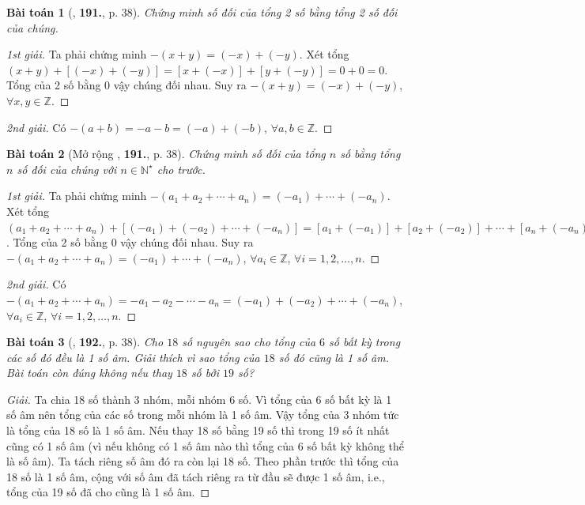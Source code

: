 \documentclass{article}
\numberwithin{equation}{section}
\newtheorem{baitoan}{Bài toán}
\begin{document}
\begin{baitoan}[\cite{Tuyen_Toan_6}, \textbf{191.}, p. 38]
	Chứng minh số đối của tổng 2 số bằng tổng 2 số đối của chúng.
\end{baitoan}

\begin{proof}[1st giải]
	Ta phải chứng minh $-(x + y) = (-x) + (-y)$. Xét tổng $(x + y) + [(-x) + (-y)] = [x + (-x)] + [y + (-y)] = 0 + 0 = 0$. Tổng của 2 số bằng 0 vậy chúng đối nhau. Suy ra $-(x + y) = (-x) + (-y)$, $\forall x,y\in\mathbb{Z}$.
\end{proof}

\begin{proof}[2nd giải]
	Có $-(a + b) = -a - b = (-a) + (-b)$, $\forall a,b\in\mathbb{Z}$.
\end{proof}

\begin{baitoan}[Mở rộng \cite{Tuyen_Toan_6}, \textbf{191.}, p. 38]
	Chứng minh số đối của tổng $n$ số bằng tổng $n$ số đối của chúng với $n\in\mathbb{N}^\star$ cho trước.
\end{baitoan}

\begin{proof}[1st giải]
	Ta phải chứng minh $-(a_1 + a_2 + \cdots + a_n) = (-a_1) + \cdots + (-a_n)$. Xét tổng $(a_1 + a_2 + \cdots + a_n) + [(-a_1) + (-a_2) + \cdots + (-a_n)] = [a_1 + (-a_1)] + [a_2 + (-a_2)] + \cdots + [a_n + (-a_n)] = 0 + 0 + \cdots + 0 = 0$. Tổng của 2 số bằng 0 vậy chúng đối nhau. Suy ra $-(a_1 + a_2 + \cdots + a_n) = (-a_1) + \cdots + (-a_n)$, $\forall a_i\in\mathbb{Z}$, $\forall i = 1,2,\ldots,n$.
\end{proof}

\begin{proof}[2nd giải]
	Có $-(a_1 + a_2 + \cdots + a_n) = -a_1 - a_2 - \cdots - a_n = (-a_1) + (-a_2) + \cdots + (-a_n)$, $\forall a_i\in\mathbb{Z}$, $\forall i = 1,2,\ldots,n$.
\end{proof}

\begin{baitoan}[\cite{Tuyen_Toan_6}, \textbf{192.}, p. 38]
	Cho $18$ số nguyên sao cho tổng của $6$ số bất kỳ trong các số đó đều là 1 số âm. Giải thích vì sao tổng của $18$ số đó cũng là 1 số âm. Bài toán còn đúng không nếu thay $18$ số bởi $19$ số?
\end{baitoan}

\begin{proof}[Giải]
	Ta chia 18 số thành 3 nhóm, mỗi nhóm 6 số. Vì tổng của 6 số bất kỳ là 1 số âm nên tổng của các số trong mỗi nhóm là 1 số âm. Vậy tổng của 3 nhóm tức là tổng của 18 số là 1 số âm. Nếu thay 18 số bằng 19 số thì trong 19 số ít nhất cũng có 1 số âm (vì nếu không có 1 số âm nào thì tổng của 6 số bất kỳ không thể là số âm). Ta tách riêng số âm đó ra còn lại 18 số. Theo phần trước thì tổng của 18 số là 1 số âm, cộng với số âm đã tách riêng ra từ đầu sẽ được 1 số âm, i.e., tổng của 19 số đã cho cũng là 1 số âm.
\end{proof}
\end{document}
